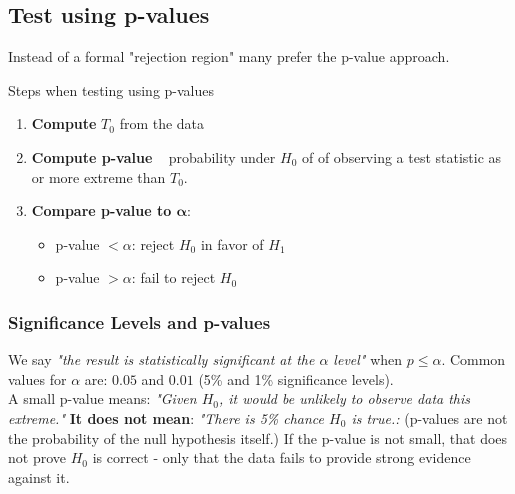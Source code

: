\documentclass[10pt]{extarticle}
\begin{document}
\subsection{Test using p-values}
Instead of a formal "rejection region" many prefer the p-value approach.\\

\begin{conceptbox}{Steps when testing using p-values}{}
    \begin{enumerate}
        \item \textbf{Compute} $T_0$ from the data
        \item \textbf{Compute p-value} ~ probability under $H_0$ of of observing a test statistic as or more extreme than $T_0$.
        \item \textbf{Compare p-value to $\boldsymbol{\alpha}$}:
        \begin{itemize}
            \item p-value $< \alpha$: reject $H_0$ in favor of $H_1$
            \item p-value $> \alpha$: fail to reject $H_0$
        \end{itemize}
    \end{enumerate}
\end{conceptbox}

\subsubsection{Significance Levels and p-values}
We say \emph{"the result is statistically significant at the $\alpha$ level"} when $p \leq \alpha$. Common values for $\alpha$ are: $0.05$ and $0.01$ (5\% and 1\% significance levels).\\[2ex]
A small p-value means: \emph{"Given $H_0$, it would be unlikely to observe data this extreme."} \textbf{It does not mean}: \emph{"There is 5\% chance $H_0$ is true.:} (p-values are not the probability of the null hypothesis itself.) If the p-value is not small, that does not prove $H_0$ is correct - only that the data fails to provide strong evidence against it.
\end{document}
